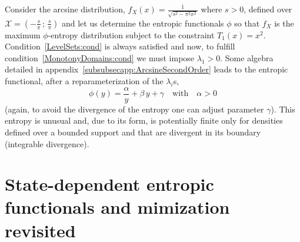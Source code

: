 \documentclass[entropy,article,submit,moreauthors,pdftex]{Definitions/mdpi}
\newcounter{arcsineExample}%
\def\X{\mathcal{X}}%
\begin{document}
%
\begin{Example}\label{arcsine:ex}\setcounter{arcsineExample}{\value{example}}
   Consider  the  arcsine distribution,  $f_X(x)  =  \frac{1}{\sqrt{s^2 -  \pi^2
       x^2}}$ where $s  > 0$, defined over  $\X = \left( -\frac{s}{\pi}  \, ; \,
   \frac{s}{\pi} \right)$ and  let us determine the  entropic functionals $\phi$
   so  that $f_X$  is the  maximum  $\phi$-entropy distribution  subject to  the
   constraint   $T_1(x)  =   x^2$.   Condition~\ref{LevelSets:cond}   is  always
   satisfied and  now, to  fulfill condition~\ref{MonotonyDomains:cond}  we must
   impose     $\lambda_1     >     0$.      Some     algebra     detailed     in
   appendix~\ref{subsubsecapp:ArcsineSecondOrder}   leads    to   the   entropic
   functional,  after  a reparameterization  of  the  $\lambda_i$s, $$\phi(y)  =
   \frac{\alpha}{y} + \beta  \, y + \gamma \quad \mbox{with}  \quad \alpha > 0$$
   (again,  to avoid  the divergence  of the  entropy one  can adjust  parameter
   $\gamma$).  This entropy  is unusual  and, due  to its  form, is  potentially
   finite  only for  densities  defined  over a  bounded  support  and that  are
   divergent in its boundary (integrable divergence).
\end{Example}




\section{State-dependent entropic functionals and mimization revisited}
\label{sec:MultiformEnt}
\end{document}
